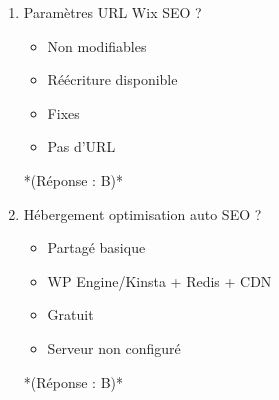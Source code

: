 \documentclass[12pt,a4paper,twoside]{report}
\begin{document}
\begin{enumerate}
\item Paramètres URL Wix SEO ?
\begin{itemize}
\item[A)] Non modifiables
\item[B)] Réécriture disponible
\item[C)] Fixes
\item[D)] Pas d'URL
\end{itemize}
*(Réponse : B)*

\item Hébergement optimisation auto SEO ?
\begin{itemize}
\item[A)] Partagé basique
\item[B)] WP Engine/Kinsta + Redis + CDN
\item[C)] Gratuit
\item[D)] Serveur non configuré
\end{itemize}
*(Réponse : B)*
\end{enumerate}
\end{document}
